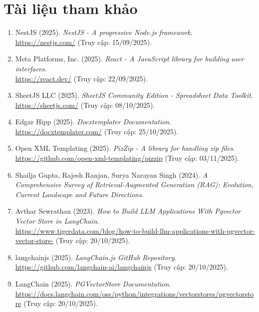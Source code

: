 \section*{Tài liệu tham khảo}

\begin{enumerate}
	\item NestJS (2025). \textit{NestJS - A progressive Node.js framework}. \\
	\url{https://nestjs.com/} (Truy cập: 15/09/2025).

	\item Meta Platforms, Inc. (2025). \textit{React - A JavaScript library for building user interfaces}. \\
	\url{https://react.dev/} (Truy cập: 22/09/2025).

	\item SheetJS LLC (2025). \textit{SheetJS Community Edition - Spreadsheet Data Toolkit}. \\
	\url{https://sheetjs.com/} (Truy cập: 08/10/2025).

	\item Edgar Hipp (2025). \textit{Docxtemplater Documentation}. \\
	\url{https://docxtemplater.com/} (Truy cập: 25/10/2025).

	\item Open XML Templating (2025). \textit{PizZip - A library for handling zip files}. \\
	\url{https://github.com/open-xml-templating/pizzip} (Truy cập: 03/11/2025).

	\item Shailja Gupta, Rajesh Ranjan, Surya Narayan Singh (2024). \textit{A Comprehensive Survey of Retrieval-Augmented Generation (RAG): Evolution, Current Landscape and Future Directions}.

	\item Avthar Sewrathan (2023). \textit{How to Build LLM Applications With Pgvector Vector Store in LangChain}. \\
	\url{https://www.tigerdata.com/blog/how-to-build-llm-applications-with-pgvector-vector-store-} (Truy cập: 20/10/2025).

	\item langchainjs (2025). \textit{LangChain.js GitHub Repository}. \\
	\url{https://github.com/langchain-ai/langchainjs} (Truy cập: 20/10/2025).

	\item LangChain (2025). \textit{PGVectorStore Documentation}. \\
	\url{https://docs.langchain.com/oss/python/integrations/vectorstores/pgvectorstore} (Truy cập: 20/10/2025).


\end{enumerate}
